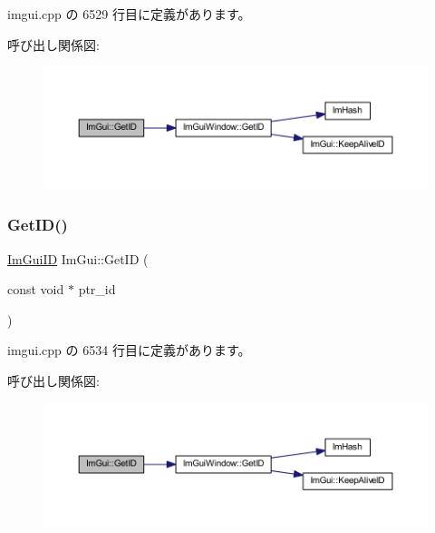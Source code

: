 imgui.\+cpp の 6529 行目に定義があります。

呼び出し関係図\+:\nopagebreak
\begin{figure}[H]
\begin{center}
\leavevmode
\includegraphics[width=350pt]{namespace_im_gui_a26064d74efebef3aa86e1a78b3e4c333_cgraph}
\end{center}
\end{figure}
\mbox{\label{namespace_im_gui_a220123ad62c2180ded92b2ef91f27c5a}} 
\subsubsection{\texorpdfstring{Get\+I\+D()}{GetID()}\hspace{0.1cm}{\footnotesize\ttfamily [3/3]}}
{\footnotesize\ttfamily \mbox{\hyperlink{imgui_8h_a1785c9b6f4e16406764a85f32582236f}{Im\+Gui\+ID}} Im\+Gui\+::\+Get\+ID (\begin{DoxyParamCaption}\item[{const void $\ast$}]{ptr\+\_\+id }\end{DoxyParamCaption})}



 imgui.\+cpp の 6534 行目に定義があります。

呼び出し関係図\+:\nopagebreak
\begin{figure}[H]
\begin{center}
\leavevmode
\includegraphics[width=350pt]{namespace_im_gui_a220123ad62c2180ded92b2ef91f27c5a_cgraph}
\end{center}
\end{figure}
\mbox{\label{namespace_im_gui_a3179e560812f878f3961ce803a5d9302}} 
